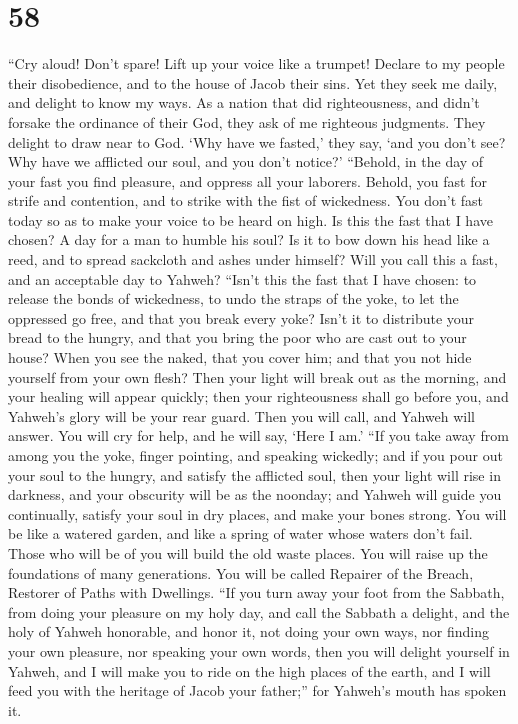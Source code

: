 \hypertarget{section-54}{%
\section{58}\label{section-54}}

 ``Cry aloud! Don't spare! Lift up your voice like a
trumpet! Declare to my people their disobedience, and to the house of
Jacob their sins.  Yet they seek me daily, and delight to
know my ways. As a nation that did righteousness, and didn't forsake the
ordinance of their God, they ask of me righteous judgments. They delight
to draw near to God.  `Why have we fasted,' they say, `and
you don't see? Why have we afflicted our soul, and you don't notice?'
``Behold, in the day of your fast you find pleasure, and oppress all
your laborers.  Behold, you fast for strife and contention,
and to strike with the fist of wickedness. You don't fast today so as to
make your voice to be heard on high.  Is this the fast that
I have chosen? A day for a man to humble his soul? Is it to bow down his
head like a reed, and to spread sackcloth and ashes under himself? Will
you call this a fast, and an acceptable day to Yahweh? 
``Isn't this the fast that I have chosen: to release the bonds of
wickedness, to undo the straps of the yoke, to let the oppressed go
free, and that you break every yoke?  Isn't it to distribute
your bread to the hungry, and that you bring the poor who are cast out
to your house? When you see the naked, that you cover him; and that you
not hide yourself from your own flesh?  Then your light will
break out as the morning, and your healing will appear quickly; then
your righteousness shall go before you, and Yahweh's glory will be your
rear guard.  Then you will call, and Yahweh will answer. You
will cry for help, and he will say, `Here I am.' ``If you take away from
among you the yoke, finger pointing, and speaking wickedly;
 and if you pour out your soul to the hungry, and satisfy
the afflicted soul, then your light will rise in darkness, and your
obscurity will be as the noonday;  and Yahweh will guide
you continually, satisfy your soul in dry places, and make your bones
strong. You will be like a watered garden, and like a spring of water
whose waters don't fail.  Those who will be of you will
build the old waste places. You will raise up the foundations of many
generations. You will be called Repairer of the Breach, Restorer of
Paths with Dwellings.  ``If you turn away your foot from
the Sabbath, from doing your pleasure on my holy day, and call the
Sabbath a delight, and the holy of Yahweh honorable, and honor it, not
doing your own ways, nor finding your own pleasure, nor speaking your
own words,  then you will delight yourself in Yahweh, and I
will make you to ride on the high places of the earth, and I will feed
you with the heritage of Jacob your father;'' for Yahweh's mouth has
spoken it.

